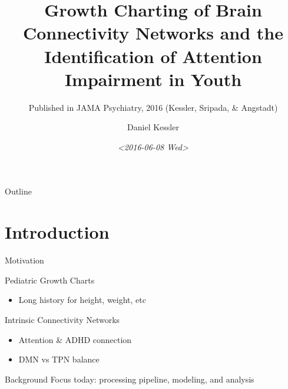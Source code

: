 \documentclass[presentation]{beamer}
\author{Daniel Kessler}
\date{\textit{<2016-06-08 Wed>}}
\title{Growth Charting of Brain Connectivity Networks and the Identification of Attention Impairment in Youth}
\subtitle{Published in JAMA Psychiatry, 2016 (Kessler, Sripada, \& Angstadt)}
\begin{document}
\maketitle
\begin{frame}{Outline}
\tableofcontents
\end{frame}




\section{Introduction}
\label{sec:orgheadline3}
\begin{frame}[label={sec:orgheadline1}]{Motivation}
\begin{block}{Pediatric Growth Charts}
\begin{itemize}
\item Long history for height, weight, etc
\end{itemize}
\end{block}
\begin{block}{Intrinsic Connectivity Networks}
\begin{itemize}
\item Attention \& ADHD connection
\item DMN vs TPN balance
\end{itemize}
\end{block}
\end{frame}
\begin{frame}[label={sec:orgheadline2}]{Background}
Focus today: processing pipeline, modeling, and analysis
\end{frame}
\end{document}
